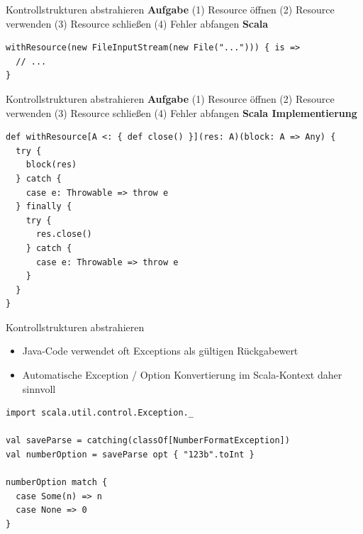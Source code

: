 \documentclass{beamer}
\begin{document}

\begin{frame}[fragile]{Kontrollstrukturen abstrahieren}
\center \textbf{Aufgabe} \linebreak	
(1) Resource öffnen (2) Resource verwenden \linebreak (3) Resource schließen (4) Fehler abfangen
\center \textbf{Scala}
\begin{lstlisting}
withResource(new FileInputStream(new File("..."))) { is =>
  // ...
}
\end{lstlisting}
\end{frame}  


\begin{frame}[fragile]{Kontrollstrukturen abstrahieren}
\center \textbf{Aufgabe} \linebreak	
(1) Resource öffnen (2) Resource verwenden \linebreak (3) Resource schließen (4) Fehler abfangen
\center \textbf{Scala Implementierung}
\begin{lstlisting}
def withResource[A <: { def close() }](res: A)(block: A => Any) {
  try {
    block(res)
  } catch {
    case e: Throwable => throw e
  } finally {
    try {
      res.close()
    } catch {
      case e: Throwable => throw e
    }
  }
}
\end{lstlisting}
\end{frame}  


\begin{frame}[fragile]{Kontrollstrukturen abstrahieren}
\begin{itemize}
	\item Java-Code verwendet oft Exceptions als gültigen Rückgabewert
	\item Automatische Exception / Option Konvertierung im Scala-Kontext daher sinnvoll
\end{itemize}
\begin{lstlisting}
import scala.util.control.Exception._

val saveParse = catching(classOf[NumberFormatException])
val numberOption = saveParse opt { "123b".toInt }   

numberOption match {
  case Some(n) => n
  case None => 0
}
\end{lstlisting}
\end{frame}  
\end{document}
